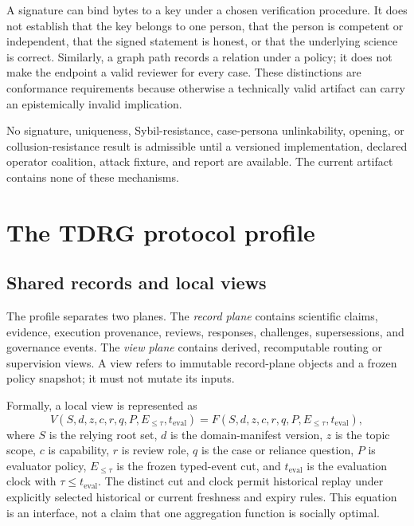 \documentclass[11pt]{article}
\newcommand{\tdrg}{TDRG}
\begin{document}
A signature can bind bytes to a key under a chosen verification procedure. It does
not establish that the key belongs to one person, that the person is competent or
independent, that the signed statement is honest, or that the underlying science is
correct. Similarly, a graph path records a relation under a policy; it does not make
the endpoint a valid reviewer for every case. These distinctions are conformance
requirements because otherwise a technically valid artifact can carry an
epistemically invalid implication.

\begin{evidencegate}
No signature, uniqueness, Sybil-resistance, case-persona unlinkability, opening, or
collusion-resistance result is admissible until a versioned implementation, declared
operator coalition, attack fixture, and report are available. The current artifact
contains none of these mechanisms.
\end{evidencegate}

\section{The \tdrg{} protocol profile}
\label{sec:protocol}

\subsection{Shared records and local views}

The profile separates two planes. The \emph{record plane} contains scientific
claims, evidence, execution provenance, reviews, responses, challenges,
supersessions, and governance events. The \emph{view plane} contains derived,
recomputable routing or supervision views. A view refers to immutable record-plane
objects and a frozen policy snapshot; it must not mutate its inputs.

Formally, a local view is represented as
\begin{equation}
V(S,d,z,c,r,q,P,E_{\leq\tau},t_{\mathrm{eval}})
 = F(S,d,z,c,r,q,P,E_{\leq\tau},t_{\mathrm{eval}}),
\end{equation}
where $S$ is the relying root set, $d$ is the domain-manifest version, $z$ is the
topic scope, $c$ is capability, $r$ is review role, $q$ is the case or reliance
question, $P$ is evaluator policy, $E_{\leq\tau}$ is the frozen typed-event cut,
and $t_{\mathrm{eval}}$ is the evaluation clock with
$\tau\leq t_{\mathrm{eval}}$. The distinct cut and clock permit historical replay
under explicitly selected historical or current freshness and expiry rules. This
equation is an interface, not a claim that one aggregation function is socially
optimal.
\end{document}
